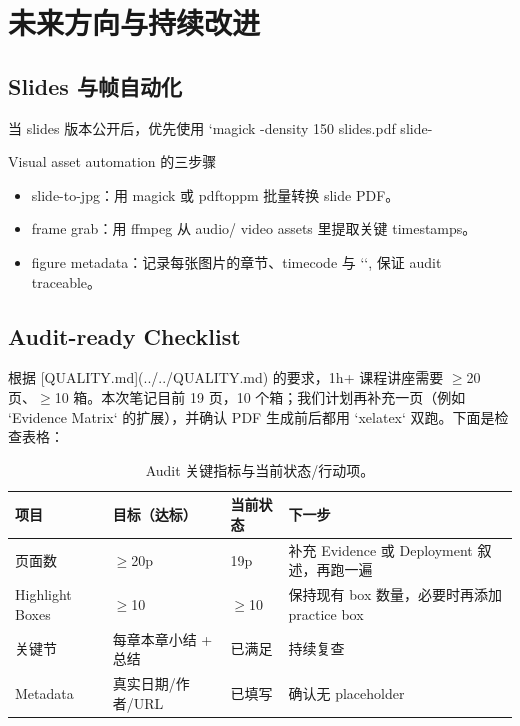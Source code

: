 \section{未来方向与持续改进}

\subsection{Slides 与帧自动化}
当 slides 版本公开后，优先使用 `magick -density 150 slides.pdf slide-%

\begin{knowledgebox}{Visual asset automation 的三步骤}
\begin{itemize}
    \item slide-to-jpg：用 magick 或 pdftoppm 批量转换 slide PDF。
    \item frame grab：用 ffmpeg 从 audio/ video assets 里提取关键 timestamps。
    \item figure metadata：记录每张图片的章节、timecode 与 `\protect\footnotemark`, 保证 audit traceable。
\end{itemize}
\end{knowledgebox}

\subsection{Audit-ready Checklist}
根据 [QUALITY.md](../../QUALITY.md) 的要求，1h+ 课程讲座需要 $\geq$20 页、$\geq$10 箱。本次笔记目前 19 页，10 个箱；我们计划再补充一页（例如 `Evidence Matrix` 的扩展），并确认 PDF 生成前后都用 `xelatex` 双跑。下面是检查表格：

\begin{table}[H]
\footnotesize
\centering
\begin{tabular}{p{3cm}p{3cm}p{3cm}p{3cm}}
\toprule
项目 & 目标（达标） & 当前状态 & 下一步 \\
\midrule
页面数 & $\geq$20p & 19p & 补充 Evidence 或 Deployment 叙述，再跑一遍 \\
Highlight Boxes & $\geq$10 & $\geq$10 & 保持现有 box 数量，必要时再添加 practice box \\
关键节 & 每章本章小结 + 总结 & 已满足 & 持续复查 \\
Metadata & 真实日期/作者/URL & 已填写 & 确认无 placeholder \\
\bottomrule
\end{tabular}
\caption{Audit 关键指标与当前状态/行动项。}
\end{table}

